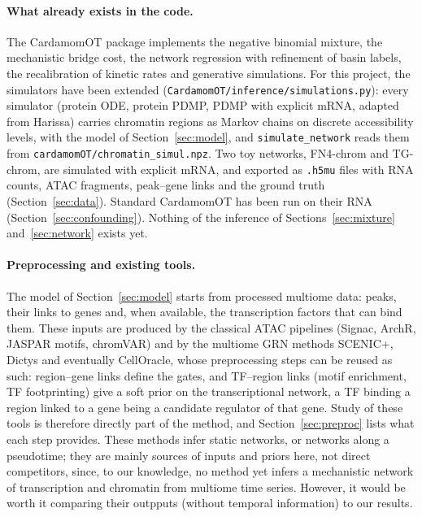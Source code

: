 \documentclass[a4paper, 11pt]{article}
\theoremstyle{plain}
\theoremstyle{remark}
\begin{document}
\paragraph{What already exists in the code.} The CardamomOT package implements the negative binomial mixture, the mechanistic bridge cost, the network regression with refinement of basin labels, the recalibration of kinetic rates and generative simulations. For this project, the simulators have been extended (\texttt{CardamomOT/inference/simulations.py}): every simulator (protein ODE, protein PDMP, PDMP with explicit mRNA, adapted from Harissa) carries chromatin regions as Markov chains on discrete accessibility levels, with the model of Section~\ref{sec:model}, and \texttt{simulate\_network} reads them from \texttt{cardamomOT/chromatin\_simul.npz}. Two toy networks, FN4-chrom and TG-chrom, are simulated with explicit mRNA, and exported as \texttt{.h5mu} files with RNA counts, ATAC fragments, peak--gene links and the ground truth (Section~\ref{sec:data}). Standard CardamomOT has been run on their RNA (Section~\ref{sec:confounding}). Nothing of the inference of Sections~\ref{sec:mixture} and~\ref{sec:network} exists yet.

\paragraph{Preprocessing and existing tools.} The model of Section~\ref{sec:model} starts from processed multiome data: peaks, their links to genes and, when available, the transcription factors that can bind them. These inputs are produced by the classical ATAC pipelines (Signac, ArchR, JASPAR motifs, chromVAR) and by the multiome GRN methods SCENIC+, Dictys and eventually CellOracle, whose preprocessing steps can be reused as such: region--gene links define the gates, and TF--region links (motif enrichment, TF footprinting) give a soft prior on the transcriptional network, a TF binding a region linked to a gene being a candidate regulator of that gene. Study of these tools is therefore directly part of the method, and Section~\ref{sec:preproc} lists what each step provides. These methods infer static networks, or networks along a pseudotime; they are mainly sources of inputs and priors here, not direct competitors, since, to our knowledge, no method yet infers a mechanistic network of transcription and chromatin from multiome time series. However, it would be worth it comparing their outpputs (without temporal information) to our results.
\end{document}
